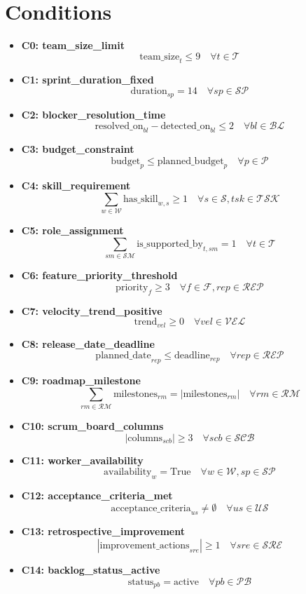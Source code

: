 \documentclass{article}
\begin{document}
\section{Conditions}
\begin{itemize}
    \item \textbf{C0: team\_size\_limit}
    \[
    \text{team\_size}_t \leq 9 \quad \forall t \in \mathcal{T}
    \]
    \item \textbf{C1: sprint\_duration\_fixed}
    \[
    \text{duration}_{sp} = 14 \quad \forall sp \in \mathcal{SP}
    \]
    \item \textbf{C2: blocker\_resolution\_time}
    \[
    \text{resolved\_on}_{bl} - \text{detected\_on}_{bl} \leq 2 \quad \forall bl \in \mathcal{BL}
    \]
    \item \textbf{C3: budget\_constraint}
    \[
    \text{budget}_p \leq \text{planned\_budget}_p \quad \forall p \in \mathcal{P}
    \]
    \item \textbf{C4: skill\_requirement}
    \[
    \sum_{w \in \mathcal{W}} \text{has\_skill}_{w,s} \geq 1 \quad \forall s \in \mathcal{S}, tsk \in \mathcal{TSK}
    \]
    \item \textbf{C5: role\_assignment}
    \[
    \sum_{sm \in \mathcal{SM}} \text{is\_supported\_by}_{t,sm} = 1 \quad \forall t \in \mathcal{T}
    \]
    \item \textbf{C6: feature\_priority\_threshold}
    \[
    \text{priority}_f \geq 3 \quad \forall f \in \mathcal{F}, rep \in \mathcal{REP}
    \]
    \item \textbf{C7: velocity\_trend\_positive}
    \[
    \text{trend}_{vel} \geq 0 \quad \forall vel \in \mathcal{VEL}
    \]
    \item \textbf{C8: release\_date\_deadline}
    \[
    \text{planned\_date}_{rep} \leq \text{deadline}_{rep} \quad \forall rep \in \mathcal{REP}
    \]
    \item \textbf{C9: roadmap\_milestone}
    \[
    \sum_{rm \in \mathcal{RM}} \text{milestones}_{rm} = |\text{milestones}_{rm}| \quad \forall rm \in \mathcal{RM}
    \]
    \item \textbf{C10: scrum\_board\_columns}
    \[
    |\text{columns}_{scb}| \geq 3 \quad \forall scb \in \mathcal{SCB}
    \]
    \item \textbf{C11: worker\_availability}
    \[
    \text{availability}_w = \text{True} \quad \forall w \in \mathcal{W}, sp \in \mathcal{SP}
    \]
    \item \textbf{C12: acceptance\_criteria\_met}
    \[
    \text{acceptance\_criteria}_{us} \neq \emptyset \quad \forall us \in \mathcal{US}
    \]
    \item \textbf{C13: retrospective\_improvement}
    \[
    |\text{improvement\_actions}_{sre}| \geq 1 \quad \forall sre \in \mathcal{SRE}
    \]
    \item \textbf{C14: backlog\_status\_active}
    \[
    \text{status}_{pb} = \text{active} \quad \forall pb \in \mathcal{PB}
    \]
\end{itemize}
\end{document}
